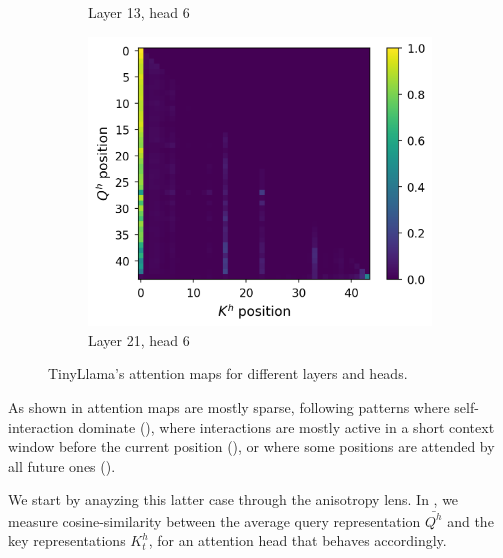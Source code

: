 \begin{figure}[!ht]
\begin{subfigure}[b]{0.45\columnwidth}
     \caption{Layer 13, head 6}
     \label{fig:l12h5}
\end{subfigure}
\hfill
\begin{subfigure}[b]{0.45\columnwidth}
     \includegraphics[width=\linewidth]{sources/part_1/anisotropy/imgs/qk_position_l20h5.png}
     \caption{Layer 21, head 6}
     \label{fig:l20h5}
\end{subfigure}
\caption{TinyLlama's attention maps for different layers and heads.}
\label{fig:attn_maps}
\end{figure}

As shown in  attention maps are mostly sparse, following patterns where self-interaction dominate (), where interactions are mostly active in a short context window before the current position (), or where some positions are attended by all future ones (). 

We start by anayzing this latter case through the anisotropy lens. In , we measure cosine-similarity between the average query representation $\bar{Q^h}$ and the key representations $K^h_t$, for an attention head that behaves accordingly.

